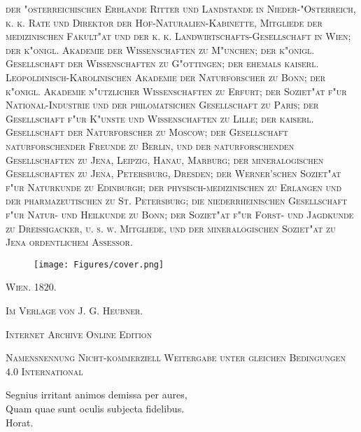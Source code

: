 \documentclass[a4paper, 11pt, oneside, german]{article}
\begin{document}
\begin{titlepage}
        {\scshape\tiny der "osterreichischen Erblande Ritter und Landstande in Nieder-"Osterreich, k. k. Rate und Direktor der Hof-Naturalien-Kabinette, Mitgliede der medizinischen Fakult"at und der k. k. Landwirtschafts-Gesellschaft in Wien; der k"onigl. Akademie der Wissenschaften zu M"unchen; der k"onigl. Gesellschaft der Wissenschaften zu G"ottingen; der ehemals kaiserl. Leopoldinisch-Karolinischen Akademie der Naturforscher zu Bonn; der k"onigl. Akademie n"utzlicher Wissenschaften zu Erfurt; der Soziet"at f"ur National-Industrie und der philomatsichen Gesellschaft zu Paris; der Gesellschaft f"ur K"unste und Wissenschaften zu Lille; der kaiserl. Gesellschaft der Naturforscher zu Moscow; der Gesellschaft naturforschender Freunde zu Berlin, und der naturforschenden Gesellschaften zu Jena, Leipzig, Hanau, Marburg; der mineralogischen Gesellschaften zu Jena, Petersburg, Dresden; der Werner'schen Soziet"at f"ur Naturkunde zu Edinburgh; der physisch-medizinischen zu Erlangen und der pharmazeutischen zu St. Petersburg; die niederrheinischen Gesellschaft f"ur Natur- und Heilkunde zu Bonn; der Soziet"at f"ur Forst- und Jagdkunde zu Dreissigacker, u. s. w. Mitgliede, und der mineralogischen Soziet"at zu Jena ordentlichem Assessor.} %

        \begin{figure}[h!]
            \centering
            \texttt{[image: Figures/cover.png]}
        \end{figure}
        
        \vspace*{\fill}

	{\small\scshape Wien. 1820.}
	
	{\small\scshape{Im Verlage von J. G. Heubner.}}
	
	\vspace{0.5\baselineskip} %

    \scshape Internet Archive Online Edition  %
	
	{\scshape\small Namensnennung Nicht-kommerziell Weitergabe unter gleichen Bedingungen 4.0 International} %
\end{titlepage}
\setlength{\parskip}{1mm plus1mm minus1mm}
\clearpage
\tableofcontents
\clearpage
\vspace*{\fill}
\begin{center}
Segnius irritant animos demissa per aures,\\
Quam quae sunt oculis subjecta fidelibus.\\
Horat.
\end{center}
\vspace*{\fill}
\clearpage
\end{document}
